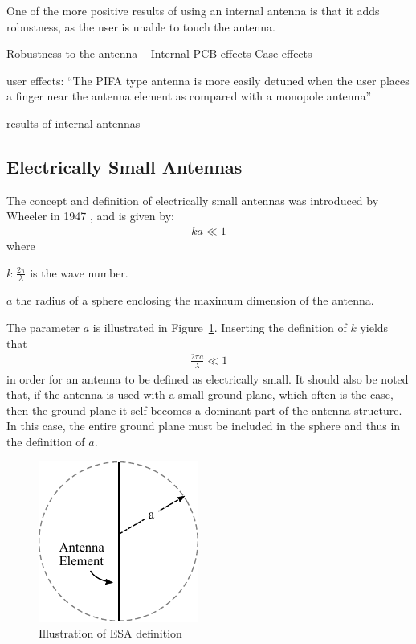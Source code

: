 One of the more positive results of using an internal antenna is that it adds robustness, as the user is unable to touch the antenna.

Robustness to the antenna -- Internal
PCB effects
Case effects

user effects:
``The PIFA type antenna is more
easily detuned when the user places a finger near the antenna element as compared with
a monopole antenna''

results of internal antennas 
\cite{fujimoto2008mobile}

\subsection{Electrically Small Antennas}
\label{sec:elsmallantennas}
The concept and definition of electrically small antennas was introduced by Wheeler in 1947 \cite{wheeler1947}, and is given by:
\begin{align}
\label{eq:esa-def}
  ka \ll 1
\end{align}
where 
\begin{where}
\item[$k$] $\frac{2\pi}{\lambda}$ is the wave number. 
\item[$a$] the radius of a sphere enclosing the maximum dimension of the antenna. 
\end{where}
The parameter $a$ is illustrated in Figure~\ref{fig:ant-esa-def}. Inserting the definition of $k$ yields that
\begin{align}
  \frac{2\pi a}{\lambda} \ll 1
\end{align}
in order for an antenna to be defined as electrically small. It should also be noted that, if the antenna is used with a small ground plane, which often is the case, then the ground plane it self becomes a dominant part of the antenna structure. In this case, the entire ground plane must be included in the sphere and thus in the definition of $a$.

\begin{figure}[htbp]
  \centering
  \includegraphics[scale=1]{img/analysis/ESA}
  \caption{Illustration of ESA definition \cite{}}
  \label{fig:ant-esa-def}
\end{figure}

